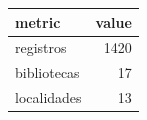\begin{tabular}{lr}
\toprule
metric & value \\
\midrule
registros & 1420 \\
bibliotecas & 17 \\
localidades & 13 \\
\bottomrule
\end{tabular}
